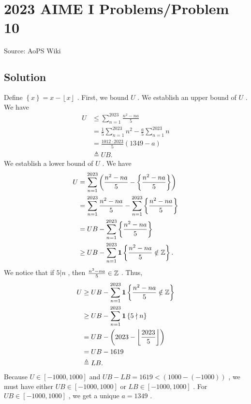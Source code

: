 \documentclass[12pt]{article}
\begin{document}
\section*{{2023 AIME I Problems/Problem 10}}
Source: AoPS Wiki

\subsection*{Solution}
Define $\left\{ x \right\} = x - \left\lfloor x \right\rfloor$ . First, we bound $U$ . We establish an upper bound of $U$ . We have \begin{align*} U & \leq \sum_{n=1}^{2023} \frac{n^2 - na}{5} \\ & = \frac{1}{5} \sum_{n=1}^{2023} n^2 - \frac{a}{5} \sum_{n=1}^{2023} n \\ & = \frac{1012 \cdot 2023}{5} \left( 1349 - a \right) \\ & \triangleq UB . \end{align*} We establish a lower bound of $U$ . We have \begin{align*} U & = \sum_{n=1}^{2023} \left( \frac{n^2 - na}{5} - \left\{ \frac{n^2 - na}{5} \right\} \right) \\ & = \sum_{n=1}^{2023} \frac{n^2 - na}{5} - \sum_{n=1}^{2023} \left\{ \frac{n^2 - na}{5} \right\} \\ & = UB - \sum_{n=1}^{2023} \left\{ \frac{n^2 - na}{5} \right\} \\ & \geq UB - \sum_{n=1}^{2023} \mathbf 1 \left\{ \frac{n^2 - na}{5} \notin \Bbb Z \right\} . \end{align*} We notice that if $5 | n$ , then $\frac{n^2 - na}{5} \in \Bbb Z$ .
Thus, \begin{align*} U & \geq UB - \sum_{n=1}^{2023} \mathbf 1 \left\{ \frac{n^2 - na}{5} \notin \Bbb Z \right\} \\ & \geq UB - \sum_{n=1}^{2023} \mathbf 1 \left\{ 5 \nmid n \right\} \\ & = UB - \left( 2023 - \left\lfloor \frac{2023}{5} \right\rfloor \right) \\ & = UB - 1619 \\ & \triangleq LB . \end{align*} Because $U \in \left[ - 1000, 1000 \right]$ and $UB - LB = 1619 < \left( 1000 - \left( - 1000 \right) \right)$ , we must have either $UB \in \left[ - 1000, 1000 \right]$ or $LB \in \left[ - 1000, 1000 \right]$ . For $UB \in \left[ - 1000, 1000 \right]$ , we get a unique $a = 1349$ .
\end{document}
